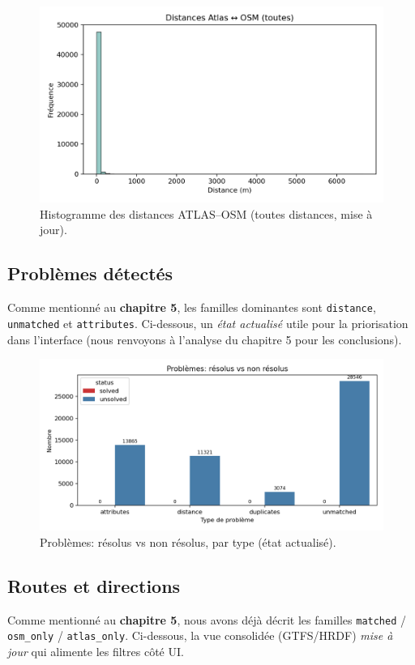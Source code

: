 \begin{figure}[h]
  \centering
  \includegraphics[width=0.68\linewidth]{figures/chap7/distances_hist_all.png}
  \caption{Histogramme des distances ATLAS–OSM (toutes distances, mise à jour).}
\end{figure}

\subsection{Problèmes détectés}
Comme mentionné au \textbf{chapitre 5}, les familles dominantes sont \texttt{distance}, \texttt{unmatched} et \texttt{attributes}. Ci-dessous, un \textit{état actualisé} utile pour la priorisation dans l'interface (nous renvoyons à l'analyse du chapitre 5 pour les conclusions).

\begin{figure}[h]
  \centering
  \includegraphics[width=0.75\linewidth]{figures/chap7/problems_breakdown.png}
  \caption{Problèmes: résolus vs non résolus, par type (état actualisé).}
\end{figure}

\subsection{Routes et directions}
Comme mentionné au \textbf{chapitre 5}, nous avons déjà décrit les familles \texttt{matched} / \texttt{osm\_only} / \texttt{atlas\_only}. Ci-dessous, la vue consolidée (GTFS/HRDF) \textit{mise à jour} qui alimente les filtres côté UI.

